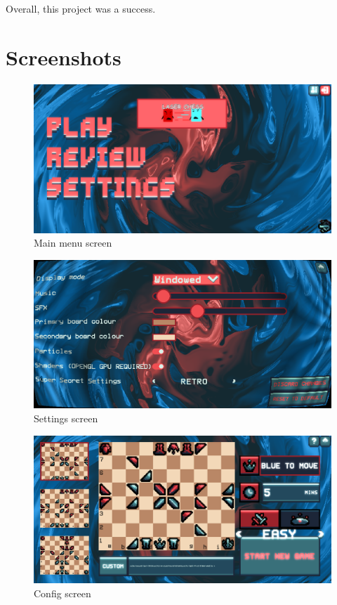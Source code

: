 \documentclass[../main/main.tex]{subfiles}
\begin{document}
Overall, this project was a success.

\newpage
\section{Screenshots}
\begin{figure}[H]
    \centering
    \includegraphics[width=\columnwidth]{../evaluation/assets/menu.png}
    \caption{Main menu screen}
    \label{fig:evaluation-menu}
\end{figure}

\begin{figure}[H]
    \centering
    \includegraphics[width=\columnwidth]{../evaluation/assets/settings.png}
    \caption{Settings screen}
    \label{fig:evaluation-settings}
\end{figure}

\begin{figure}[H]
    \centering
    \includegraphics[width=\columnwidth]{../evaluation/assets/config.png}
    \caption{Config screen}
    \label{fig:evaluation-config}
\end{figure}
\end{document}
